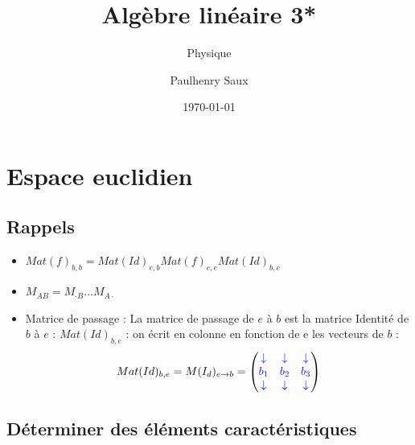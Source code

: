 \documentclass[french]{yLectureNote}
\title{Algèbre linéaire 3*}
\subtitle{Physique}
\author{Paulhenry Saux}
\date{\today}
\begin{document}
\chapter{Espace euclidien}

\section{Rappels}
\begin{itemize}
 \item \(Mat(f)_{b,b} = Mat(Id)_{e,b}Mat(f)_{e,e}Mat(Id)_{b,e}\)
 \item \(M_{AB} = M_{\cdot B}\dots M_{A\cdot}\)
 \item Matrice de passage : La matrice de passage de \(e\) à \(b\) est la matrice Identité de \(b\) à \(e\) : \(Mat(Id)_{b,e}\) : on écrit en colonne en fonction de e les vecteurs de \(b\) : $$Mat(Id)_{b,e} =  M(I_d)_{e\to b} = \begin{pmatrix} 
\color{blue}\downarrow & \color{blue}\downarrow & \color{blue}\downarrow \\
\color{blue}b_1 & \color{blue}b_2 & \color{blue}b_3 \\
\color{blue}\downarrow & \color{blue}\downarrow & \color{blue}\downarrow 
\end{pmatrix}$$
\end{itemize}
\section{Déterminer des éléments caractéristiques}
\end{document}
